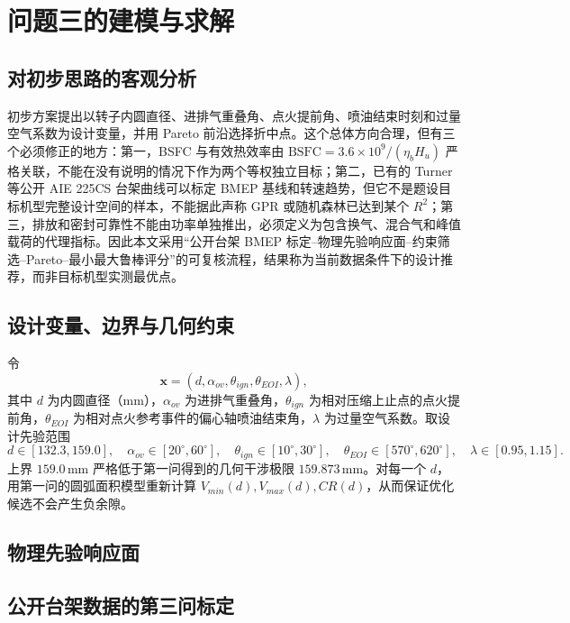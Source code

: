 \section{问题三的建模与求解}

\subsection{对初步思路的客观分析}

初步方案提出以转子内圆直径、进排气重叠角、点火提前角、喷油结束时刻和过量空气系数为设计变量，并用 Pareto 前沿选择折中点。这个总体方向合理，但有三个必须修正的地方：第一，BSFC 与有效热效率由 $\mathrm{BSFC}=3.6\times10^9/(\eta_b H_u)$ 严格关联，不能在没有说明的情况下作为两个等权独立目标；第二，已有的 Turner 等公开 AIE 225CS 台架曲线可以标定 BMEP 基线和转速趋势，但它不是题设目标机型完整设计空间的样本，不能据此声称 GPR 或随机森林已达到某个 $R^2$；第三，排放和密封可靠性不能由功率单独推出，必须定义为包含换气、混合气和峰值载荷的代理指标。因此本文采用“公开台架 BMEP 标定--物理先验响应面--约束筛选--Pareto--最小最大鲁棒评分”的可复核流程，结果称为当前数据条件下的设计推荐，而非目标机型实测最优点。

\subsection{设计变量、边界与几何约束}

令
\begin{equation}
 \mathbf{x}=(d,\alpha_{ov},\theta_{ign},\theta_{EOI},\lambda),
\end{equation}
其中 $d$ 为内圆直径（mm），$\alpha_{ov}$ 为进排气重叠角，$\theta_{ign}$ 为相对压缩上止点的点火提前角，$\theta_{EOI}$ 为相对点火参考事件的偏心轴喷油结束角，$\lambda$ 为过量空气系数。取设计先验范围
\begin{equation}
 d\in[132.3,159.0],\quad \alpha_{ov}\in[20^\circ,60^\circ],\quad
 \theta_{ign}\in[10^\circ,30^\circ],\quad \theta_{EOI}\in[570^\circ,620^\circ],\quad
 \lambda\in[0.95,1.15].
\end{equation}
上界 $159.0\,\mathrm{mm}$ 严格低于第一问得到的几何干涉极限 $159.873\,\mathrm{mm}$。对每一个 $d$，用第一问的圆弧面积模型重新计算 $V_{min}(d),V_{max}(d),CR(d)$，从而保证优化候选不会产生负余隙。

\subsection{物理先验响应面}

\subsection{公开台架数据的第三问标定}

